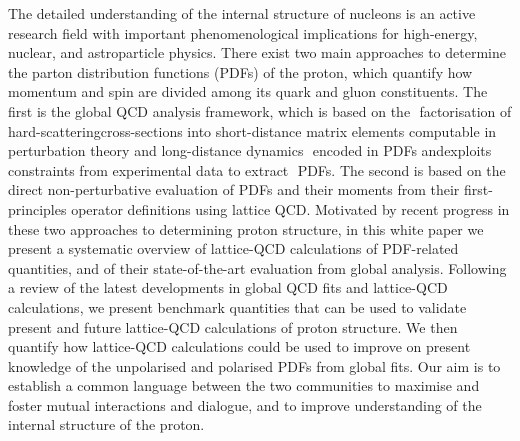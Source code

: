 \documentclass[twoside,12pt]{article}
\numberwithin{equation}{section}
\numberwithin{figure}{section}
\numberwithin{table}{section}
\begin{document}
The detailed understanding of the internal structure of nucleons is an active
research field with important phenomenological implications for
high-energy, nuclear, and astroparticle physics.
%
There exist two main approaches to determine the
parton distribution functions (PDFs) of the proton, which
quantify how momentum and spin 
are divided among its quark and gluon constituents.
%
The​ ​first​ ​is​ the ​global​ ​QCD​ ​analysis framework,​ ​which​ ​is​ ​based​ ​on the​ ​
factorisation​ ​of​ ​hard-scattering​ ​cross-sections​ ​into​ ​short-distance​ ​matrix​ 
​elements computable​ ​in​ ​perturbation​ ​theory​ ​and​ ​long-distance​ ​dynamics​ ​
encoded​ ​in​ ​PDFs and ​exploits constraints​ ​from​ ​experimental​ ​data​ ​to​ ​extract​ ​
PDFs.
%
The second is based on the direct non-perturbative evaluation of PDFs
and their moments from their first-principles operator
definitions using lattice QCD.
%
Motivated by recent progress in these two approaches
to determining proton structure, in this white paper we present a systematic
overview of lattice-QCD calculations of PDF-related quantities, and of
their state-of-the-art evaluation from global analysis.
%
Following a review of the latest
developments in global QCD fits and lattice-QCD calculations,
we present benchmark quantities that can be
used to validate present and future
lattice-QCD calculations of proton structure.
%
We then quantify how lattice-QCD calculations could be used
to improve on present knowledge
of the unpolarised and polarised PDFs from global fits.
%
Our aim is
to establish a common language between the two communities to 
maximise and foster mutual interactions and dialogue, and to improve
understanding of the internal structure of the proton.

\clearpage

  \tableofcontents

\clearpage











\appendix







\newpage

\end{document}
